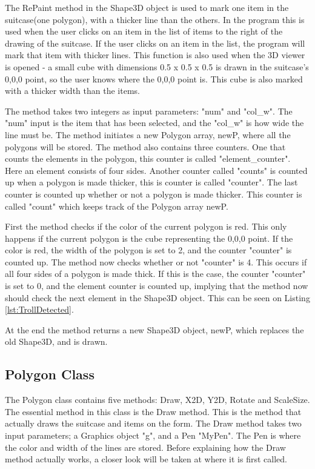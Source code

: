 The RePaint method in the Shape3D object is used to mark one item in the suitcase(one polygon), with a thicker line than the others. In the program this is used when the user clicks on an item in the list of items to the right of the drawing of the suitcase. If the user clicks on an item in the list, the program will mark that item with thicker lines. This function is also used when the 3D viewer is opened - a small cube with dimensions 0.5 x 0.5 x 0.5 is drawn in the suitcase's 0,0,0 point, so the user knows where the 0,0,0 point is. This cube is also marked with a thicker width than the items.

The method takes two integers as input parameters: "num" and "col\_w". The "num" input is the item that has been selected, and the "col\_w" is how wide the line must be. The method initiates a new Polygon array, newP, where all the polygons will be stored. The method also contains three counters. One that counts the elements in the polygon, this counter is called "element\_counter". Here an element consists of four sides. Another counter called "counts" is counted up when a polygon is made thicker, this is counter is called "counter". The last counter is counted up whether or not a polygon is made thicker. This counter is called "count" which keeps track of the Polygon array newP.

First the method checks if the color of the current polygon is red. This only happens if the current polygon is the cube representing the 0,0,0 point. If the color is red, the width of the polygon is set to 2, and the counter "counter" is counted up. The method now checks whether or not "counter" is 4. This occurs if all four sides of a polygon is made thick. If this is the case, the counter "counter" is set to 0, and the element counter is counted up, implying that the method now should check the next element in the Shape3D object. This can be seen on Listing \ref{lst:TrollDetected}.


At the end the method returns a new Shape3D object, newP, which replaces the old Shape3D, and is drawn.

\subsection{Polygon Class} 
The Polygon class contains five methods: Draw, X2D, Y2D, Rotate and ScaleSize. The essential method in this class is the Draw method. This is the method that actually draws the suitcase and items on the form. The Draw method takes two input parameters; a Graphics object "g", and a Pen "MyPen". The Pen is where the color and width of the lines are stored. Before explaining how the Draw method actually works, a closer look will be taken at where it is first called.

